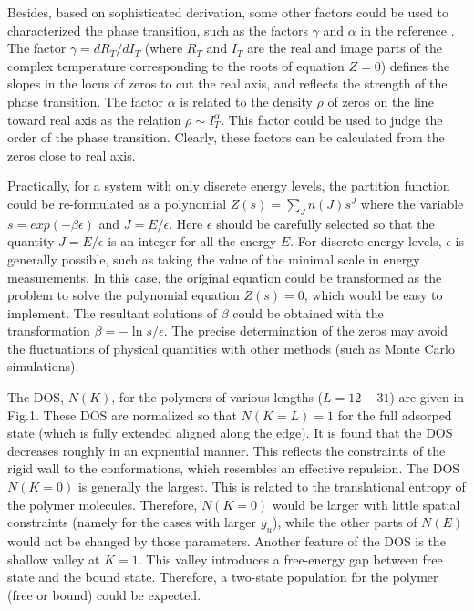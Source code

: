 \documentclass[preprint,preprintnumbers,amsmath,amssymb,showpacs,aps,pre]{revtex4-1}
\begin{document}
Besides, based on sophisticated derivation, some other factors could be used
to characterized the phase transition, such as the factors $\gamma$ and
$\alpha$ in the reference \cite{WangJCP03}. The factor $\gamma=d R_T/d I_T$
(where $R_T$ and $I_T$ are the real and image parts of the complex temperature
corresponding to the roots of equation $Z=0$) defines the slopes in the locus
of zeros to cut the real axis, and reflects the strength of the phase
transition. The factor $\alpha$ is related to the density $\rho$ of zeros on
the line toward real axis as the relation $\rho \sim I_T^{\alpha}$. This
factor could be used to judge the order of the phase transition. Clearly,
these factors can be calculated from the zeros close to real axis.

Practically, for a system with only discrete energy levels, the partition
function could be
re-formulated as a polynomial $Z(s)=\sum_J n(J) s^J$ where the variable
$s=exp(-\beta\epsilon)$ and $J=E/\epsilon$. Here $\epsilon$ should be carefully
selected so that the quantity $J=E/\epsilon$ is an integer for all the energy
$E$. For discrete energy levels, $\epsilon$ is generally possible, such as
taking the value of the minimal scale in energy measurements. In this case, the
original equation could be transformed as the problem to solve the polynomial
equation $Z(s)=0$, which would be easy to implement. The resultant solutions
of $\beta$ could be obtained with the transformation $\beta=-\ln s/\epsilon$.
The precise determination of the zeros may avoid the fluctuations of physical
quantities with other methods (such as Monte Carlo simulations).


The DOS, $N(K)$, for the polymers of various lengths ($L=12-31$)
are given in Fig.1. These DOS are normalized so that $N(K=L)=1$
for the full adsorped state (which is fully extended aligned along the edge).
It is found that the DOS decreases roughly in an expnential manner. This
reflects the constraints of the rigid wall to the conformations, which
resembles an effective repulsion. The DOS $N(K=0)$ is generally the largest.
This is related to the translational entropy of the polymer molecules.
Therefore, $N(K=0)$ would be larger with little spatial constraints
(namely for the cases with larger $y_u$), while the other parts of $N(E)$
would not be changed by those parameters. Another feature of the DOS
is the shallow valley at $K=1$. This valley introduces a free-energy
gap between free state and the bound state. Therefore, a two-state
population for the polymer (free or bound) could be expected.
\end{document}
